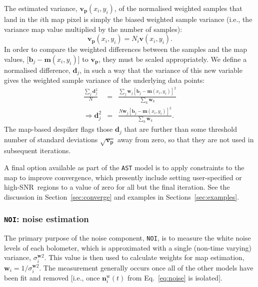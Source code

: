 \documentclass[useAMS,usenatbib,nofootinbib]{mn2e}
\newcommand{\snr}{SNR}
\newcommand{\model}[1]{\texttt{#1}}
\begin{document}
The estimated variance, $\mathbf{v_p}(x_i,y_i)$, of the normalised
weighted samples that land in the $i$th map pixel is simply the biased
weighted sample variance (i.e., the variance map value multiplied by
the number of samples):
%
\begin{equation}
  \mathbf{v_p}(x_i,y_i) = N_i \mathbf{v}(x_i,y_i).
\end{equation}
%
In order to compare the weighted differences between the samples and
the map values, [$\mathbf{b}_j - \mathbf{m}(x_i,y_i)$] to
$\mathbf{v_p}$, they must be scaled appropriately. We define a
normalised difference, $\mathbf{d}_j$, in such a way that the variance
of this new variable gives the weighted sample variance of the
underlying data points:
%
\begin{eqnarray}
  \frac{\sum_j \mathbf{d}_j^2}{N} &=&
  \frac{\sum_j \mathbf{w}_j [\mathbf{b}_j - \mathbf{m}(x_i,y_i)]^2}
       {\sum_k \mathbf{w}_k} \\
   \Rightarrow \mathbf{d}_j^2 &=& \frac{N \mathbf{w}_j [\mathbf{b}_j -
       \mathbf{m}(x_i,y_i)]^2}{ \sum_k \mathbf{w}_k} .
\end{eqnarray}
%
The map-based despiker flags those $\mathbf{d}_j$ that are further
than some threshold number of standard deviations
$\sqrt{\mathbf{v_p}}$ away from zero, so that they are not used in
subsequent iterations.

A final option available as part of the \model{AST} model is to apply
constraints to the map to improve convergence, which presently include
setting user-specified or high-\snr\ regions to a value of zero for
all but the final iteration. See the discussion in
Section~\ref{sec:converge} and examples in
Sections~\ref{sec:examples}.

\subsubsection{\model{NOI}: noise estimation}
\label{sec:noi}

The primary purpose of the noise component, \model{NOI}, is to measure
the white noise levels of each bolometer, which is approximated with a
single (non-time varying) variance, $\sigma_i^{\mathbf{w}2}$. This
value is then used to calculate weights for map estimation,
$\mathbf{w}_i = 1/\sigma_i^{\mathbf{w}2}$. The measurement generally
occurs once all of the other models have been fit and removed [i.e.,
once $\mathbf{n}^\mathrm{w}_i(t)$ from Eq.~\ref{eq:noise} is
isolated].
\end{document}
